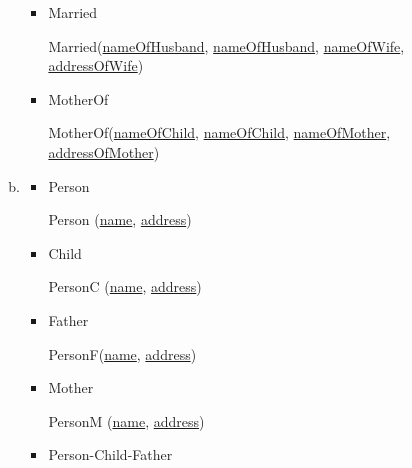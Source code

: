 \documentclass[12pt]{article}
\begin{document}
\begin{enumerate}[1.]
\begin{enumerate}[a)]
\begin{itemize}
            \bigskip

            \item Married

            \bigskip

            \quad Married(\underline{nameOfHusband}, \underline{nameOfHusband},
                    \underline{nameOfWife}, \underline{addressOfWife})

            \bigskip

            \item MotherOf

            \bigskip

            \quad MotherOf(\underline{nameOfChild}, \underline{nameOfChild},
                    \underline{nameOfMother}, \underline{addressOfMother})

            \bigskip
        \end{itemize}
        \item

        \begin{itemize}
            \item Person

            \bigskip

            \quad Person (\underline{name}, \underline{address})

            \bigskip

            \item Child

            \bigskip

            \quad PersonC (\underline{name}, \underline{address})

            \bigskip

            \item Father

            \bigskip

            \quad PersonF(\underline{name}, \underline{address})

            \bigskip

            \item Mother

            \bigskip

            \quad PersonM (\underline{name}, \underline{address})

            \bigskip

            \item Person-Child-Father

            \bigskip


\end{itemize}
\end{enumerate}
\end{enumerate}
\end{document}
